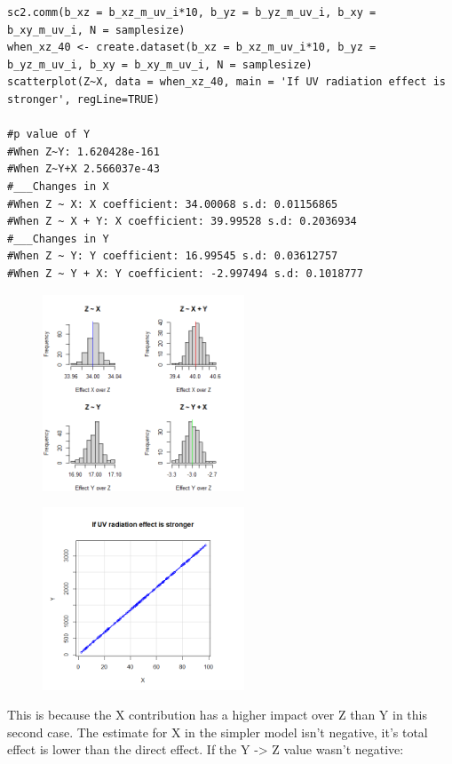 \documentclass{article}
\begin{document}
\begin{lstlisting}
sc2.comm(b_xz = b_xz_m_uv_i*10, b_yz = b_yz_m_uv_i, b_xy = b_xy_m_uv_i, N = samplesize)
when_xz_40 <- create.dataset(b_xz = b_xz_m_uv_i*10, b_yz = b_yz_m_uv_i, b_xy = b_xy_m_uv_i, N = samplesize)
scatterplot(Z~X, data = when_xz_40, main = 'If UV radiation effect is stronger', regLine=TRUE)

#p value of Y
#When Z~Y: 1.620428e-161
#When Z~Y+X 2.566037e-43 
#___Changes in X
#When Z ~ X: X coefficient: 34.00068 s.d: 0.01156865
#When Z ~ X + Y: X coefficient: 39.99528 s.d: 0.2036934
#___Changes in Y
#When Z ~ Y: Y coefficient: 16.99545 s.d: 0.03612757
#When Z ~ Y + X: Y coefficient: -2.997494 s.d: 0.1018777
\end{lstlisting}

\begin{figure}[h]
\includegraphics[width=6cm]{hist40.png}
\centering
\end{figure}

\begin{figure}[h]
\includegraphics[width=6cm]{scatterplot40.png}
\centering
\end{figure}

This is because the X contribution has a higher impact over Z than Y in this second case. The estimate for X in the simpler model isn't negative, it's total effect is lower than the direct effect. If the Y -> Z value wasn't negative:
\end{document}
